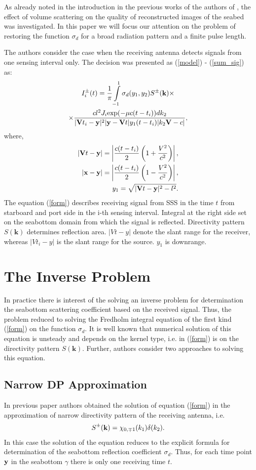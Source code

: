 \documentclass{procDDs}
\begin{document}
As already noted in the introduction in the previous works of the authors of \cite{AF2015, SPIE_KOV}, the effect of volume scattering on the quality of reconstructed images of the seabed was investigated. In this paper we will focus our attention on the problem of restoring the  function $\sigma_d$ for a broad radiation pattern and a finite pulse length.

The authors consider the case when the receiving antenna detects signals from one sensing interval only. The decision was presented as (\ref{model}) - (\ref{sum_sig}) as:
\begin{multline}
	\label{form}
	I^\pm_i(t) = \frac{1}{\pi}\int\limits_{-1}^{1}\sigma_d(y_1,y_2) S^{\pm}(\mathbf{k}) \times \\ \times
	\frac{ cl^2J_i \text{exp}(-\mu c(t-t_i))dk_2}{|\mathbf{V}t_i-\mathbf{y}|^2|\mathbf{y}-\mathbf{V}t|y_1(t-t_i)|k_2 \mathbf{V}-c|},
\end{multline}
where, 
\begin{align*}
	|\mathbf{V}t - \mathbf{y}| = \left|\dfrac{c(t-t_i)}{2}\left(1+\dfrac{V^2}{c^2}\right) \right|, \\
	|\mathbf{x}-\mathbf{y}| = \left|\dfrac{c(t-t_i)}{2}\left(1-\dfrac{V^2}{c^2}\right) \right|, \\
	y_1 = \sqrt{|\mathbf{V}t-\mathbf{y}|^2 - l^2}.
\end{align*}
The equation (\ref{form}) describes receiving signal from SSS in the time $t$ from starboard and port side in the i-th sensing interval. Integral at the right side set on the seabottom domain from which the signal is reflected. Directivity pattern $S(\textbf{k})$ determines reflection area. $|Vt-y|$ denote the slant range for the receiver, whereas $|Vt_i-y|$   is the slant range for the source. $y_1$ is downrange.

\section{The Inverse Problem}
In practice there is interest of the solving an inverse problem for determination the seabottom scattering coefficient based on the received signal. Thus, the problem reduced to solving the Fredholm integral equation of the first kind (\ref{form}) on the function $\sigma_d$. It is well known that numerical solution of this equation is unsteady and depends on the kernel type, i.e. in (\ref{form}) is on the directivity pattern $S(\textbf{k})$. Further, authors consider two approaches to solving this equation.
\subsection{Narrow DP Approximation}
In previous paper \cite{SPIE_KOV} authors obtained the solution of equation (\ref{form}) in the approximation of narrow directivity pattern of the receiving antenna, i.e. 
	\begin{equation}
	S^{\pm}(\mathbf{k}) = \chi_{0,\mp1}(k_1)\delta(k_2).
	\end{equation}
 In this case the solution of the equation reduces to the explicit formula for determination of the  seabottom reflection coefficient $\sigma_d$. Thus, for each time point $\mathbf{y}$ in the seabottom $\gamma$ there is only one receiving time $t$.
 
\end{document}

